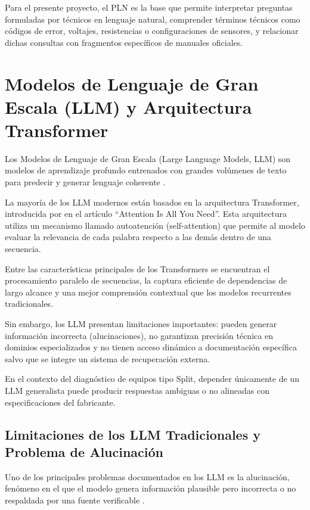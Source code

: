 {{Para el presente proyecto, el PLN es la base que permite interpretar preguntas formuladas por técnicos en lenguaje natural, comprender términos técnicos como códigos de error, voltajes, resistencias o configuraciones de sensores, y relacionar dichas consultas con fragmentos específicos de manuales oficiales.

\section{Modelos de Lenguaje de Gran Escala (LLM) y Arquitectura Transformer}

Los Modelos de Lenguaje de Gran Escala (Large Language Models, LLM) son modelos de aprendizaje profundo entrenados con grandes volúmenes de texto para predecir y generar lenguaje coherente \parencite{brown2020language}.

La mayoría de los LLM modernos están basados en la arquitectura Transformer, introducida por \textcite{vaswani2017attention} en el artículo ``Attention Is All You Need''. Esta arquitectura utiliza un mecanismo llamado autoatención (self-attention) que permite al modelo evaluar la relevancia de cada palabra respecto a las demás dentro de una secuencia.

Entre las características principales de los Transformers se encuentran el procesamiento paralelo de secuencias, la captura eficiente de dependencias de largo alcance y una mejor comprensión contextual que los modelos recurrentes tradicionales.

Sin embargo, los LLM presentan limitaciones importantes: pueden generar información incorrecta (alucinaciones), no garantizan precisión técnica en dominios especializados y no tienen acceso dinámico a documentación específica salvo que se integre un sistema de recuperación externa.

En el contexto del diagnóstico de equipos tipo Split, depender únicamente de un LLM generalista puede producir respuestas ambiguas o no alineadas con especificaciones del fabricante.

\subsection{Limitaciones de los LLM Tradicionales y Problema de Alucinación}

Uno de los principales problemas documentados en los LLM es la alucinación, fenómeno en el que el modelo genera información plausible pero incorrecta o no respaldada por una fuente verificable \parencite{ji2023survey}.

}}
